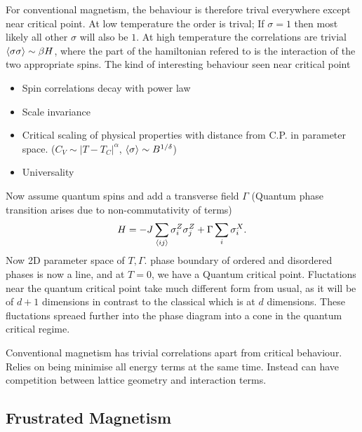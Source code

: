 \documentclass[a4paper]{article}
\begin{document}
For conventional magnetism, the behaviour is therefore trival everywhere except
near critical point. At low temperature the order is trival; If $\sigma=1$ then
most likely all other $\sigma$ will also be $1$. At high temperature the
correlations are trivial $\braket{\sigma\sigma}\sim\beta H$, where the part of
the hamiltonian refered to is the interaction of the two appropriate spins. The
kind of interesting behaviour seen near critical point
\begin{itemize}
    \item Spin correlations decay with power law
    \item Scale invariance
    \item Critical scaling of physical properties with distance from C.P. in
        parameter space. ($C_V\sim|T-T_C|^\alpha$, $\braket{\sigma}\sim
        B^{1/\delta}$)
    \item Universality
\end{itemize}

\begin{example}
    Now assume quantum spins and add a transverse field $\Gamma$ (Quantum phase
    transition arises due to non-commutativity of terms) 
    \[
        H=-J\sum_{\braket{ij}}\sigma_i^Z\sigma_j^Z +\Gamma \sum_i\sigma_i^X.
    \]
   Now 2D parameter space of $T,\Gamma$. phase boundary of ordered and
   disordered phases is now a line, and at $T=0$, we have a Quantum critical
   point. Fluctations near the quantum critical point take much different form
   from usual, as it will be of $d+1$ dimensions in contrast to the classical
   which is at $d$ dimensions. These fluctations spreaed further into the phase
   diagram into a cone in the quantum critical regime.
\end{example}
Conventional magnetism has trivial correlations apart from critical behaviour.
Relies on being minimise all energy terms at the same time.
Instead can have competition between lattice geometry and interaction terms.
\subsection{Frustrated Magnetism}
\end{document}
